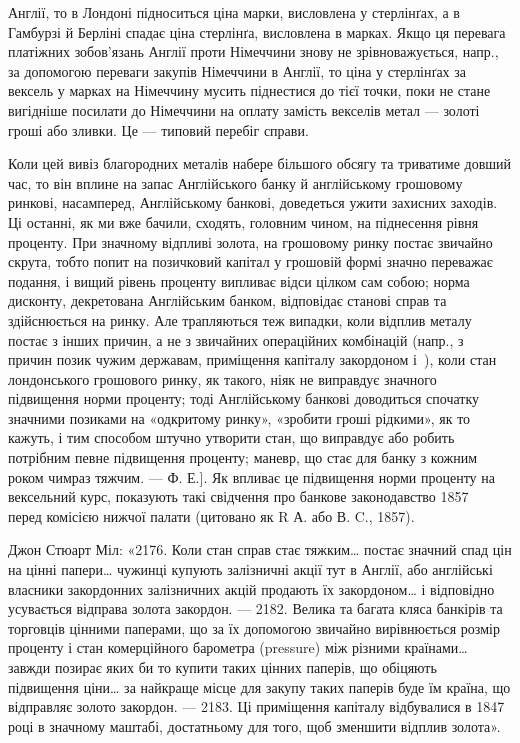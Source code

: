 \parcont{}  %
Англії, то в Лондоні підноситься ціна марки, висловлена у стерлінґах, а в Гамбурзі
й Берліні спадає ціна стерлінґа, висловлена в марках. Якщо ця перевага
платіжних зобов’язань Англії проти Німеччини знову не зрівноважується, напр.,
за допомогою переваги закупів Німеччини в Англії, то ціна у стерлінґах за
вексель у марках на Німеччину мусить піднестися до тієї точки, поки не стане
вигідніше посилати до Німеччини на оплату замість векселів метал — золоті гроші
або зливки. Це — типовий перебіг справи.

Коли цей вивіз благородних металів набере більшого обсягу та триватиме
довший час, то він вплине на запас Англійського банку й англійському грошовому
ринкові, насамперед, Англійському банкові, доведеться ужити захисних заходів.
Ці останні, як ми вже бачили, сходять, головним чином, на піднесення
рівня проценту. При значному відпливі золота, на грошовому ринку постає звичайно
скрута, тобто попит на позичковий капітал у грошовій формі значно
переважає подання, і вищий рівень проценту випливає відси цілком сам собою;
норма дисконту, декретована Англійським банком, відповідає станові справ та
здійснюється на ринку. Але трапляються теж випадки, коли відплив металу
постає з інших причин, а не з звичайних операційних комбінацій (напр., з причин
позик чужим державам, приміщення капіталу закордоном і~), коли стан
лондонського грошового ринку, як такого, ніяк не виправдує значного підвищення
норми проценту; тоді Англійському банкові доводиться спочатку значними
позиками на «одкритому ринку», «зробити гроші рідкими», як то кажуть, і тим
способом штучно утворити стан, що виправдує або робить потрібним певне підвищення
проценту; маневр, що стає для банку з кожним роком чимраз тяжчим. —
Ф. Е.]. Як впливає це підвищення норми проценту на вексельний курс, показують
такі свідчення про банкове законодавство 1857~ перед комісією нижчої
палати (цитовано як R А. або В. C., 1857).

Джон Стюарт Міл: «2176. Коли стан справ стає тяжким\dots{} постає значний
спад цін на цінні папери\dots{} чужинці купують залізничні акції тут в Англії,
або англійські власники закордонних залізничних акцій продають їх закордоном\dots{}
і відповідно усувається відправа золота закордон. — 2182. Велика та багата
кляса банкірів та торговців цінними паперами, що за їх допомогою звичайно
вирівнюється розмір проценту і стан комерційного барометра (pressure) між
різними країнами\dots{} завжди позирає яких би то купити таких цінних паперів,
що обіцяють підвищення ціни\dots{} за найкраще місце для закупу таких
паперів буде їм країна, що відправляє золото закордон. — 2183. Ці приміщення
капіталу відбувалися в 1847 році в значному маштабі, достатньому для того, щоб
зменшити відплив золота».


